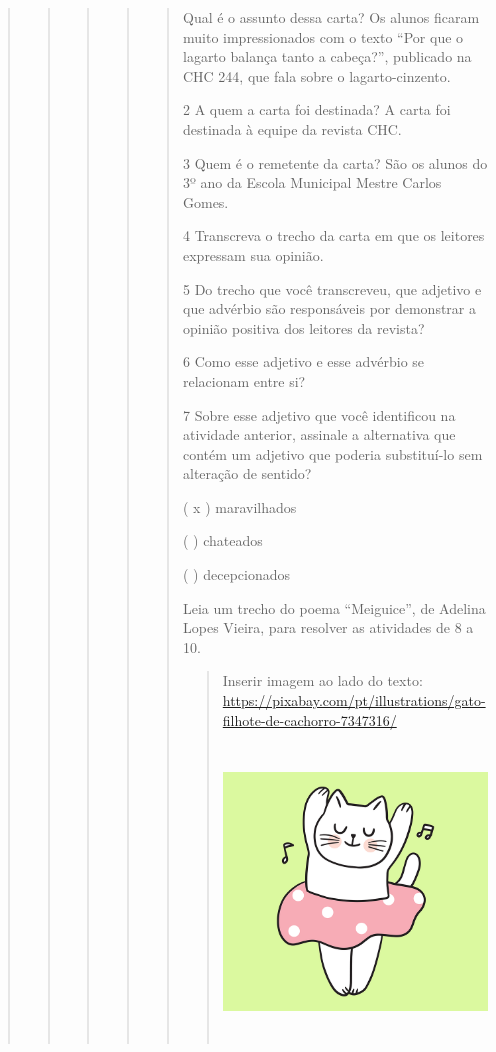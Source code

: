 \begin{quote}
\begin{quote}
\begin{quote}
\begin{quote}
\begin{quote}
 Qual é o assunto dessa carta? Os alunos ficaram muito impressionados
com o texto ``Por que o lagarto balança tanto a cabeça?'', publicado na
CHC 244, que fala sobre o lagarto-cinzento.

\num{2} A quem a carta foi destinada? A carta foi destinada à equipe da revista CHC.

\num{3} Quem é o remetente da carta? São os alunos do 3º ano da Escola Municipal
  Mestre Carlos Gomes.

\num{4} Transcreva o trecho da carta em que os leitores expressam sua opinião.

\num{5} Do trecho que você transcreveu, que adjetivo e que advérbio são responsáveis por demonstrar a opinião positiva dos leitores da revista?

\num{6} Como esse adjetivo e esse advérbio se relacionam entre si?

\num{7} Sobre esse adjetivo que você identificou na atividade anterior, assinale a alternativa que contém um adjetivo que poderia substituí-lo sem alteração de sentido?

( x ) maravilhados

( ) chateados

( ) decepcionados

Leia um trecho do poema ``Meiguice'', de Adelina Lopes Vieira, para resolver as atividades de 8 a 10.

\begin{quote}
Inserir imagem ao lado do texto:
\url{https://pixabay.com/pt/illustrations/gato-filhote-de-cachorro-7347316/}

\includegraphics[width=3.41667in,height=3.07500in]{media/image23.png}


\end{quote}
\end{quote}
\end{quote}
\end{quote}
\end{quote}
\end{quote}
